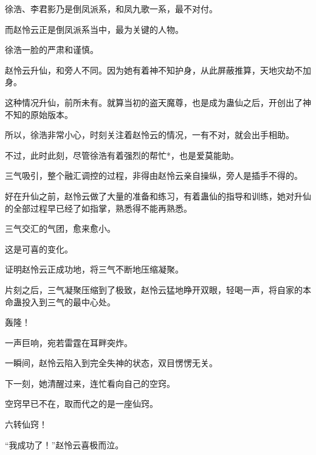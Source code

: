 \begin{this_body}
徐浩、李君影乃是倒凤派系，和凤九歌一系，最不对付。

而赵怜云正是倒凤派系当中，最为关键的人物。

徐浩一脸的严肃和谨慎。

赵怜云升仙，和旁人不同。因为她有着神不知护身，从此屏蔽推算，天地灾劫不加身。

这种情况升仙，前所未有。就算当初的盗天魔尊，也是成为蛊仙之后，开创出了神不知的原始版本。

所以，徐浩非常小心，时刻关注着赵怜云的情况，一有不对，就会出手相助。

不过，此时此刻，尽管徐浩有着强烈的帮忙*，也是爱莫能助。

三气吸引，整个融汇调控的过程，非得由赵怜云亲自操纵，旁人是插手不得的。

好在升仙之前，赵怜云做了大量的准备和练习，有着蛊仙的指导和训练，她对升仙的全部过程早已经了如指掌，熟悉得不能再熟悉。

三气交汇的气团，愈来愈小。

这是可喜的变化。

证明赵怜云正成功地，将三气不断地压缩凝聚。

片刻之后，三气凝聚压缩到了极致，赵怜云猛地睁开双眼，轻喝一声，将自家的本命蛊投入到三气的最中心处。

轰隆！

一声巨响，宛若雷霆在耳畔突炸。

一瞬间，赵怜云陷入到完全失神的状态，双目愣愣无关。

下一刻，她清醒过来，连忙看向自己的空窍。

空窍早已不在，取而代之的是一座仙窍。

六转仙窍！

“我成功了！”赵怜云喜极而泣。

\end{this_body}

